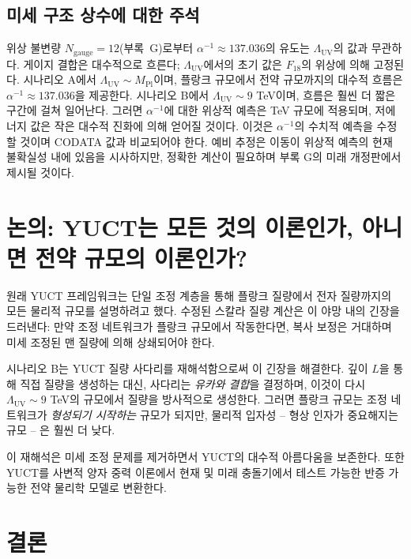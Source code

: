 \documentclass[11pt,a4paper]{article}
\newcommand{\Mpl}{M_{\mathrm{Pl}}}
\newcommand{\LUV}{\Lambda_{\mathrm{UV}}}
\theoremstyle{remark}
\begin{document}
	\subsection{미세 구조 상수에 대한 주석}
	
	위상 불변량 \(N_{\mathrm{gauge}} = 12\)(부록~G)로부터 \(\alpha^{-1} \approx 137.036\)의 유도는 \(\LUV\)의 값과 무관하다. 게이지 결합은 대수적으로 흐른다; \(\LUV\)에서의 초기 값은 \(F_{18}\)의 위상에 의해 고정된다. 시나리오 A에서 \(\LUV \sim \Mpl\)이며, 플랑크 규모에서 전약 규모까지의 대수적 흐름은 \(\alpha^{-1} \approx 137.036\)을 제공한다. 시나리오 B에서 \(\LUV \sim 9\) TeV이며, 흐름은 훨씬 더 짧은 구간에 걸쳐 일어난다. 그러면 \(\alpha^{-1}\)에 대한 위상적 예측은 TeV 규모에 적용되며, 저에너지 값은 작은 대수적 진화에 의해 얻어질 것이다. 이것은 \(\alpha^{-1}\)의 수치적 예측을 수정할 것이며 CODATA 값과 비교되어야 한다. 예비 추정은 이동이 위상적 예측의 현재 불확실성 내에 있음을 시사하지만, 정확한 계산이 필요하며 부록 G의 미래 개정판에서 제시될 것이다.
	
	\section{논의: YUCT는 모든 것의 이론인가, 아니면 전약 규모의 이론인가?}
	\label{sec:discussion}
	
	원래 YUCT 프레임워크는 단일 조정 계층을 통해 플랑크 질량에서 전자 질량까지의 모든 물리적 규모를 설명하려고 했다. 수정된 스칼라 질량 계산은 이 야망 내의 긴장을 드러낸다: 만약 조정 네트워크가 플랑크 규모에서 작동한다면, 복사 보정은 거대하며 미세 조정된 맨 질량에 의해 상쇄되어야 한다.
	
	시나리오 B는 YUCT 질량 사다리를 재해석함으로써 이 긴장을 해결한다. 깊이 \(L\)을 통해 직접 질량을 생성하는 대신, 사다리는 \emph{유카와 결합}을 결정하며, 이것이 다시 \(\LUV \sim 9\) TeV의 규모에서 질량을 방사적으로 생성한다. 그러면 플랑크 규모는 조정 네트워크가 \emph{형성되기 시작하는} 규모가 되지만, 물리적 입자성 – 형상 인자가 중요해지는 규모 – 은 훨씬 더 낮다.
	
	이 재해석은 미세 조정 문제를 제거하면서 YUCT의 대수적 아름다움을 보존한다. 또한 YUCT를 사변적 양자 중력 이론에서 현재 및 미래 충돌기에서 테스트 가능한 반증 가능한 전약 물리학 모델로 변환한다.
	
	\section{결론}
	\label{sec:conclusion}
	
\end{document}
